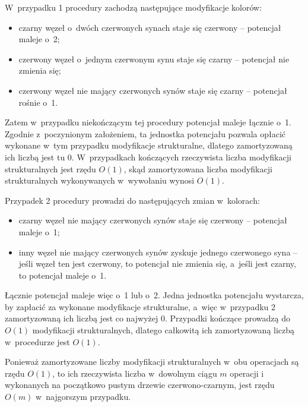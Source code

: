 \subproblem %
W~przypadku 1 procedury  zachodzą następujące modyfikacje kolorów:
\begin{itemize}
	\item czarny węzeł o~dwóch czerwonych synach staje się czerwony -- potencjał maleje o~2;
	\item czerwony węzeł o~jednym czerwonym synu staje się czarny -- potencjał nie zmienia się;
	\item czerwony węzeł nie mający czerwonych synów staje się czarny -- potencjał rośnie o~1.
\end{itemize}
Zatem w~przypadku niekończącym tej procedury potencjał maleje łącznie o~1.
Zgodnie z~poczynionym założeniem, ta jednostka potencjału pozwala opłacić wykonane w~tym przypadku modyfikacje strukturalne, dlatego zamortyzowaną ich liczbą jest tu 0.
W~przypadkach kończących rzeczywista liczba modyfikacji strukturalnych jest rzędu $O(1)$, skąd zamortyzowana liczba modyfikacji strukturalnych wykonywanych w~wywołaniu  wynosi $O(1)$.

\subproblem %
Przypadek 2 procedury  prowadzi do następujących zmian w~kolorach:
\begin{itemize}
	\item czarny węzeł nie mający czerwonych synów staje się czerwony -- potencjał maleje o~1;
	\item inny węzeł nie mający czerwonych synów zyskuje jednego czerwonego syna -- jeśli węzeł ten jest czerwony, to potencjał nie zmienia się, a~jeśli jest czarny, to potencjał maleje o~1.
\end{itemize}
Łącznie potencjał maleje więc o~1 lub o~2.
Jedna jednostka potencjału wystarcza, by zapłacić za wykonane modyfikacje strukturalne, a~więc w~przypadku 2 zamortyzowaną ich liczbą jest co najwyżej 0.
Przypadki kończące prowadzą do $O(1)$ modyfikacji strukturalnych, dlatego całkowitą ich zamortyzowaną liczbą w~procedurze  jest $O(1)$.

\subproblem %
Ponieważ zamortyzowane liczby modyfikacji strukturalnych w~obu operacjach są rzędu $O(1)$, to ich rzeczywista liczba w~dowolnym ciągu $m$ operacji  i~ wykonanych na początkowo pustym drzewie czerwono-czarnym, jest rzędu $O(m)$ w~najgorszym przypadku.
